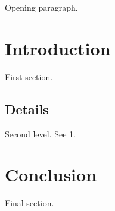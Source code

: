 \documentclass{article}
\begin{document}
Opening paragraph.
\section{Introduction}
\label{sec:intro}
First section.
\subsection{Details}
Second level. See \ref{sec:intro}.
\section{Conclusion}
Final section.
\end{document}
